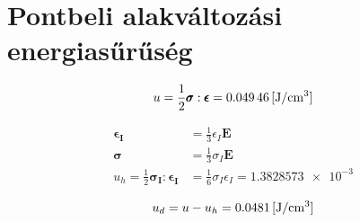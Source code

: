 \section{Pontbeli alakváltozási energiasűrűség}

\begin{equation*}
	u = \frac{1}{2}\pmb{\sigma}:\pmb{\epsilon} = \SI{0.04946}{[\joule\per\centi\meter^3]} \\
\end{equation*}

\begin{align*}
	\pmb{\epsilon_I} &= \frac{1}{3}\epsilon_I\pmb{E} \\
	\pmb{\sigma} &= \frac{1}{3}\sigma_I\pmb{E} \\
	u_h = \frac{1}{2}\pmb{\sigma_I}:\pmb{\epsilon_I} &= \frac{1}{6} \sigma_I \epsilon_I = \num{1.3828573e-3}
\end{align*}

\begin{equation*}
	u_d = u - u_h = \SI{0.0481}{[\joule\per\centi\meter^3]} \\
\end{equation*}
